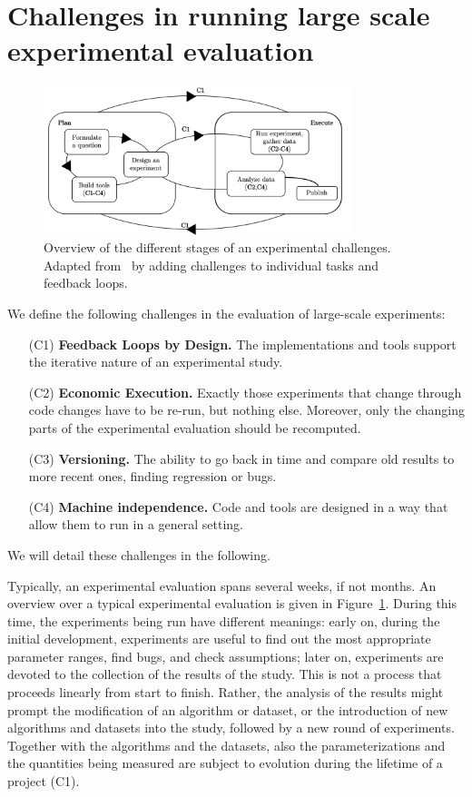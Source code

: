 \documentclass{llncs}
\begin{document}
\section{Challenges in running large scale experimental evaluation}
\begin{figure}[t]
  \centering
  \includegraphics[width=0.8\textwidth]{figs/experiment_scheme.png}
  \caption{Overview of the different stages of an experimental challenges. Adapted from~\cite{DBLP:reference/algo/McGeoch08} by adding challenges to individual tasks and feedback loops.}
  \label{fig:overview}
\end{figure}
We define the following challenges in the  evaluation of large-scale experiments:
\begin{enumerate}
  \item[(C1)] \textbf{Feedback Loops by Design.} The implementations and tools support the iterative nature of an experimental study.
  \item[(C2)] \textbf{Economic Execution.} Exactly those experiments that change through code changes have to be re-run, but nothing else. 
  Moreover, only the changing parts of the experimental evaluation should be recomputed.
  \item[(C3)] \textbf{Versioning.} The ability to go back in time and compare old results to more recent ones, finding regression or bugs.
  \item[(C4)] \textbf{Machine independence.} Code and tools are designed in a way that allow them to run in a general setting.
\end{enumerate}
%
We will detail these challenges in the following. 

Typically, an experimental evaluation spans several weeks, if not months. An overview over a typical experimental evaluation is given in Figure~\ref{fig:overview}. 
During this time, the experiments being run have different meanings: early
on, during the initial development, experiments are useful to find out the most
appropriate parameter ranges, find bugs, and check assumptions; later on,
experiments are devoted to the collection of the results of the study.
This is not a process that proceeds linearly from start to finish. 
Rather, the analysis of the results might prompt the modification of an algorithm
or dataset, or the introduction of new algorithms and datasets into the study,
followed by a new round of experiments.
Together with the algorithms and the datasets, also the parameterizations and the
quantities being measured are subject to evolution during the lifetime of a project (C1).
\end{document}
